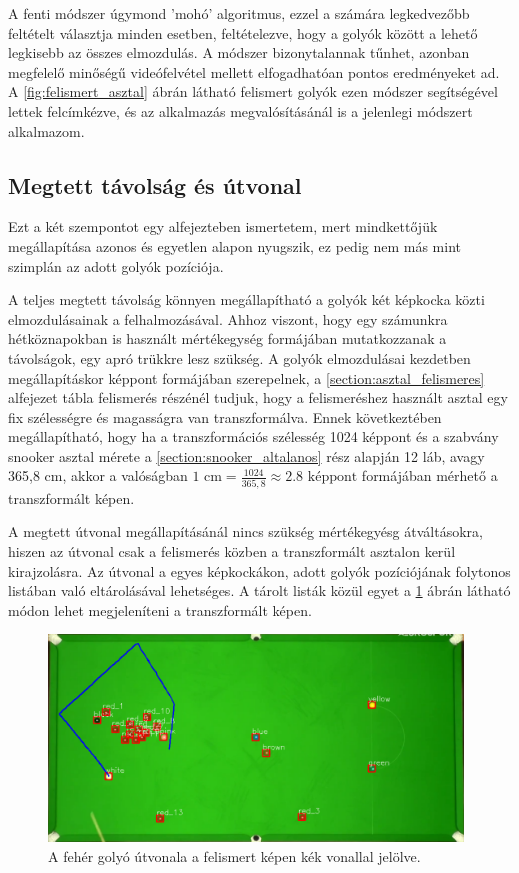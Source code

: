 \par A fenti módszer úgymond 'mohó' algoritmus, ezzel a számára legkedvezőbb feltételt választja minden esetben, feltételezve, hogy a golyók között a lehető legkisebb az összes elmozdulás. A módszer bizonytalannak tűnhet, azonban megfelelő minőségű videófelvétel mellett elfogadhatóan pontos eredményeket ad. A \ref{fig:felismert_asztal} ábrán látható felismert golyók ezen módszer segítségével lettek felcímkézve, és az alkalmazás megvalósításánál is a jelenlegi módszert alkalmazom.

\subsection{Megtett távolság és útvonal}
Ezt a két szempontot egy alfejezteben ismertetem, mert mindkettőjük megállapítása azonos és egyetlen alapon nyugszik, ez pedig nem más mint szimplán az adott golyók pozíciója.
\par A teljes megtett távolság könnyen megállapítható a golyók két képkocka közti elmozdulásainak a felhalmozásával. Ahhoz viszont, hogy egy számunkra hétköznapokban is használt mértékegység formájában mutatkozzanak a távolságok, egy apró trükkre lesz szükség. A golyók elmozdulásai kezdetben megállapításkor képpont formájában szerepelnek, a \ref{section:asztal_felismeres} alfejezet tábla felismerés részénél tudjuk, hogy a felismeréshez használt asztal egy fix szélességre és magasságra van transzformálva. Ennek következtében megállapítható, hogy ha a transzformációs szélesség 1024 képpont és a szabvány snooker asztal mérete a \ref{section:snooker_altalanos} rész alapján 12 láb, avagy 365,8 cm, akkor a valóságban $1\text{ cm} = \frac{1024}{365,8} \approx 2.8\text{ képpont}$ formájában mérhető a transzformált képen.
\par A megtett útvonal megállapításánál nincs szükség mértékegyésg átváltásokra, hiszen az útvonal csak a felismerés közben a transzformált asztalon kerül kirajzolásra. Az útvonal a egyes képkockákon, adott golyók pozíciójának folytonos listában való eltárolásával lehetséges. A tárolt listák közül egyet a \ref{fig:golyo_utvonal} ábrán látható módon lehet megjeleníteni a transzformált képen.

\begin{figure}[!ht]
    \centering
    \includegraphics[width=110mm, keepaspectratio]{figures/ball_path.png}
    \caption{A fehér golyó útvonala a felismert képen kék vonallal jelölve.}
    \label{fig:golyo_utvonal}
\end{figure}

